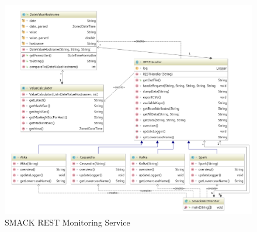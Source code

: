 \begin{figure}[!htbp]
  \centering
  \includegraphics[keepaspectratio=true,scale=0.42]{img/smack_rest_monitor_uml}
    \caption{SMACK REST Monitoring Service}
  \label{fig:smack_rest_monitor_uml}
\end{figure}

